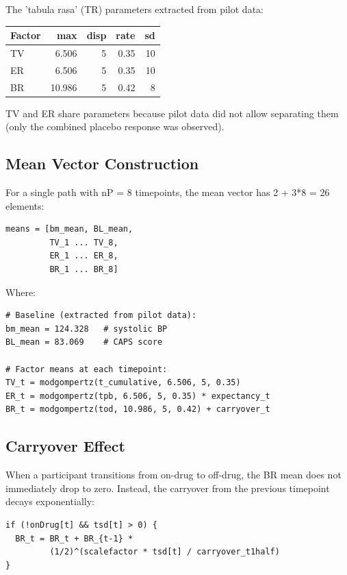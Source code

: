 \documentclass[11pt]{article}
\begin{document}
The 'tabula rasa' (TR) parameters extracted from pilot data:

\begin{table}[h]
\centering
\begin{tabular}{lrrrr}
\toprule
Factor & max & disp & rate & sd \\
\midrule
TV & 6.506 & 5 & 0.35 & 10 \\
ER & 6.506 & 5 & 0.35 & 10 \\
BR & 10.986 & 5 & 0.42 & 8 \\
\bottomrule
\end{tabular}
\end{table}

TV and ER share parameters because pilot data did not allow
separating them (only the combined placebo response was
observed).

\subsection{Mean Vector Construction}

For a single path with nP = 8 timepoints, the mean vector has
2 + 3*8 = 26 elements:

\begin{verbatim}
means = [bm_mean, BL_mean,
         TV_1 ... TV_8,
         ER_1 ... ER_8,
         BR_1 ... BR_8]
\end{verbatim}

Where:

\begin{lstlisting}
# Baseline (extracted from pilot data):
bm_mean = 124.328   # systolic BP
BL_mean = 83.069    # CAPS score

# Factor means at each timepoint:
TV_t = modgompertz(t_cumulative, 6.506, 5, 0.35)
ER_t = modgompertz(tpb, 6.506, 5, 0.35) * expectancy_t
BR_t = modgompertz(tod, 10.986, 5, 0.42) + carryover_t
\end{lstlisting}

\subsection{Carryover Effect}

When a participant transitions from on-drug to off-drug, the BR
mean does not immediately drop to zero. Instead, the carryover
from the previous timepoint decays exponentially:

\begin{lstlisting}
if (!onDrug[t] && tsd[t] > 0) {
  BR_t = BR_t + BR_{t-1} *
         (1/2)^(scalefactor * tsd[t] / carryover_t1half)
}
\end{lstlisting}
\end{document}

